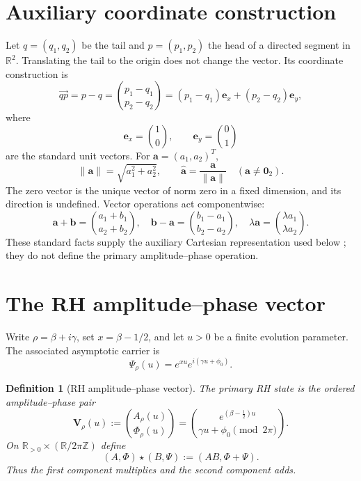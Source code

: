 \documentclass[11pt]{article}
\newtheorem{definition}{Definition}[section]
\newcommand{\vzero}{\mathbf 0}
\begin{document}
\section{Auxiliary coordinate construction}
Let $q=(q_1,q_2)$ be the tail and $p=(p_1,p_2)$ the head of a directed segment in
$\mathbb R^2$.  Translating the tail to the origin does not change the vector.  Its coordinate
construction is
\begin{equation}\label{eq:displacement}
 \overrightarrow{qp}=p-q
 =\binom{p_1-q_1}{p_2-q_2}
 =(p_1-q_1)\mathbf e_x+(p_2-q_2)\mathbf e_y,
\end{equation}
where
\begin{equation}
 \mathbf e_x=\binom10,\qquad \mathbf e_y=\binom01
\end{equation}
are the standard unit vectors.  For $\mathbf a=(a_1,a_2)^T$,
\begin{equation}\label{eq:norm-direction}
 \|\mathbf a\|=\sqrt{a_1^2+a_2^2},\qquad
 \widehat{\mathbf a}=\frac{\mathbf a}{\|\mathbf a\|}\quad(\mathbf a\ne\vzero_2).
\end{equation}
The zero vector is the unique vector of norm zero in a fixed dimension, and its direction is
undefined.  Vector operations act componentwise:
\begin{equation}
 \mathbf a+\mathbf b=\binom{a_1+b_1}{a_2+b_2},\quad
 \mathbf b-\mathbf a=\binom{b_1-a_1}{b_2-a_2},\quad
 \lambda\mathbf a=\binom{\lambda a_1}{\lambda a_2}.
\end{equation}
These standard facts supply the auxiliary Cartesian representation used below
\cite{MathInsightVectors}; they do not define the primary amplitude--phase operation.

\section{The RH amplitude--phase vector}
Write $\rho=\beta+i\gamma$, set $x=\beta-1/2$, and let $u>0$ be a finite evolution
parameter.  The associated asymptotic carrier is
\begin{equation}\label{eq:carrier}
 \Psi_\rho(u)=e^{xu}e^{i(\gamma u+\phi_0)}.
\end{equation}

\begin{definition}[RH amplitude--phase vector]\label{def:amplitude-phase}
The primary RH state is the ordered amplitude--phase pair
\begin{equation}\label{eq:amplitude-phase-vector}
 \boxed{
 \mathbf V_\rho(u)
 :=\binom{A_\rho(u)}{\Phi_\rho(u)}
 =\binom{e^{(\beta-\frac12)u}}{\gamma u+\phi_0\pmod{2\pi}}.}
\end{equation}
On $\mathbb R_{>0}\times(\mathbb R/2\pi\mathbb Z)$ define
\begin{equation}\label{eq:star-operation}
 \boxed{(A,\Phi)\star(B,\Psi):=(AB,\Phi+\Psi).}
\end{equation}
Thus the first component multiplies and the second component adds.
\end{definition}
\end{document}
